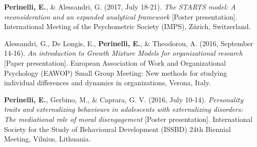 \documentclass[hidelinks, letterpaper,10pt]{article} %
\begin{document}
\begin{etaremune}
    \item \textbf{Perinelli, E.}, \& Alessandri, G. (2017, July 18-21). \textit{The STARTS model: A reconsideration and an expanded analytical framework} [Poster presentation]. International Meeting of the Psychometric Society (IMPS), Zürich, Switzerland.

    \item Alessandri, G., De Longis, E., \textbf{Perinelli, E.}, \& Theodorou, A. (2016, September 14-16). \textit{An introduction to Growth Mixture Models for organizational research} [Paper presentation]. European Association of Work and Organizational Psychology (EAWOP) Small Group Meeting: New methods for studying individual differences and dynamics in organizations, Verona, Italy.

    \item \textbf{Perinelli, E.}, Gerbino, M., \& Caprara, G. V. (2016, July 10-14). \textit{Personality traits and externalizing behaviours in adolescents with externalizing disorders: The mediational role of moral disengagement} [Poster presentation]. International Society for the Study of Behavioural Development (ISSBD) 24th Biennial Meeting, Vilnius, Lithuania.
\end{etaremune}
\vspace{3mm}
\end{document}
